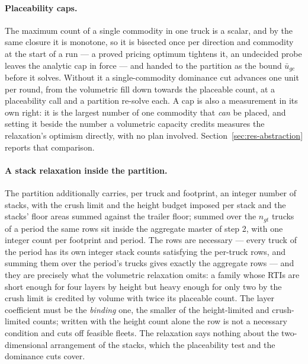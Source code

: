 \paragraph{Placeability caps.}
The maximum count of a single commodity in one truck is a scalar, and by
the same closure it is monotone, so it is bisected once per direction
and commodity at the start of a run --- a proved pricing optimum tightens
it, an undecided probe leaves the analytic cap in force --- and handed to
the partition as the bound $\bar u_{gc}$ before it solves. Without it a
single-commodity dominance cut advances one unit per round, from the
volumetric fill down towards the placeable count, at a placeability call
and a partition re-solve each. A cap is also a measurement in its own
right: it is the largest number of one commodity that \emph{can} be
placed, and setting it beside the number a volumetric capacity credits
measures the relaxation's optimism directly, with no plan involved.
Section~\ref{sec:res-abstraction} reports that comparison.

\paragraph{A stack relaxation inside the partition.}
The partition additionally carries, per truck and footprint, an integer
number of stacks, with the crush limit and the height budget imposed per
stack and the stacks' floor areas summed against the trailer floor;
summed over the $n_{gt}$ trucks of a period the same rows sit inside the
aggregate master of step 2, with one integer count per footprint and
period. The rows are necessary --- every truck of the period has its own
integer stack counts satisfying the per-truck rows, and summing them over
the period's trucks gives exactly the aggregate rows --- and they are
precisely what the volumetric relaxation omits: a family whose RTIs are
short enough for four layers by height but heavy enough for only two by
the crush limit is credited by volume with twice its placeable count.
The layer coefficient must be the \emph{binding} one, the smaller of the
height-limited and crush-limited counts; written with the height count
alone the row is not a necessary condition and cuts off feasible fleets.
The relaxation says nothing about the two-dimensional arrangement of the
stacks, which the placeability test and the dominance cuts cover.

